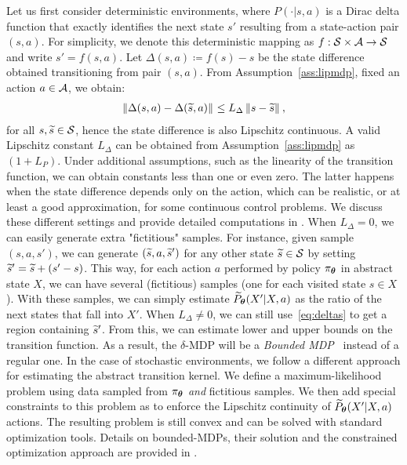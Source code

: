 %
Let us first consider deterministic environments, where $P(\cdot|s, a)$ is a Dirac delta function that exactly identifies the next state $s'$ resulting from a state-action pair $(s,a)$. For simplicity, we denote this deterministic mapping as $f:\mathcal{S}\times\mathcal{A}\to\mathcal{S}$ and write $s'=f(s,a)$.
Let $\Delta(s, a) \coloneqq f(s) - s$ be the state difference obtained transitioning from pair $(s,a)$. From Assumption~\ref{ass:lipmdp}, fixed an action $a\in\mathcal{A}$, we obtain:
%
\begin{align}\label{eq:deltas}
\left\|\Delta (s, a) - \Delta (\widetilde{s}, a)\right\|_{} \leq L_{\Delta}\left\|s - \widetilde{s}\right\|_{},
\end{align}
%
for all $s,\widetilde{s}\in\mathcal{S}$, hence the state difference is also Lipschitz continuous. A valid Lipschitz constant $L_{\Delta}$ can be obtained from Assumption~\ref{ass:lipmdp} as $(1+L_{P})$. Under additional assumptions, such as the linearity of the transition function, we can obtain constants less than one or even zero. The latter happens when the state difference depends only on the action, which can be realistic, or at least a good approximation, for some continuous control problems. We discuss these different settings and provide detailed computations in .
%
When $L_{\Delta}=0$, we can easily generate extra "fictitious" samples. For instance, given sample $(s,a,s')$, we can generate $(\widetilde{s},a,\widetilde{s}')$ for any other state $\widetilde{s}\in\mathcal{S}$ by setting $\widetilde{s}' = \widetilde{s} + (s'-s)$. This way, for each action $a$ performed by policy $\pi_{\boldsymbol{\theta}}$ in abstract state $X$, we can have several (fictitious) samples (one for each visited state $s\in X$). With these samples, we can simply estimate $\widetilde{P}_{\boldsymbol{\theta}}(X'|X,a)$ as the ratio of the next states that fall into $X'$.
When $L_{\Delta}\neq 0$, we can still use~\eqref{eq:deltas} to get a region containing $\widetilde{s}'$.
From this, we can estimate lower and upper bounds on the transition function. As a result, the $\delta$-MDP will be a \textit{Bounded MDP}~\citep{givan2000bounded} instead of a regular one.
%
In the case of stochastic environments, we follow a different approach for estimating the abstract transition kernel. We define a maximum-likelihood problem using data sampled from $\pi_{\boldsymbol{\theta}}$ \textit{and} fictitious samples. We then add special constraints to this problem as to enforce the Lipschitz continuity of $\widetilde{P}_{\boldsymbol{\theta}}(X'|X,a)$ \wrt actions. The resulting problem is still convex and can be solved with standard optimization tools.
Details on bounded-MDPs, their solution and the constrained optimization approach are provided in . 

